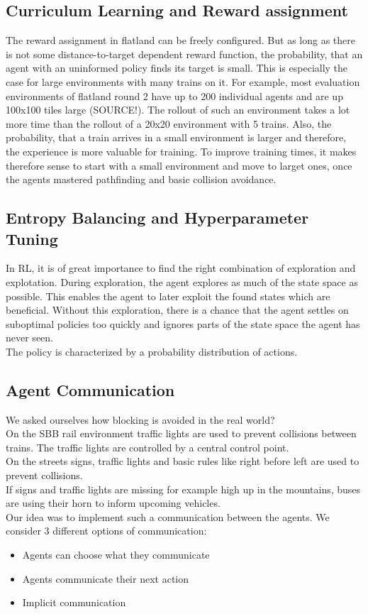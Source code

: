 \subsection*{Curriculum Learning and Reward assignment}\label{curriculum_learning}
The reward assignment in flatland can be freely configured. But as long as there is not some distance-to-target dependent reward function, the probability, that an agent with an uninformed policy finds its target is small. This is especially the case for large environments with many trains on it. For example, most evaluation environments of flatland round 2 have up to 200 individual agents and are up 100x100 tiles large (SOURCE!). The rollout of such an environment takes a lot more time than the rollout of a 20x20 environment with 5 trains. Also, the probability, that a train arrives in a small environment is larger and therefore, the experience is more valuable for training.
To improve training times, it makes therefore sense to start with a small environment and move to larget ones, once the agents mastered pathfinding and basic collision avoidance.

\subsection*{Entropy Balancing and Hyperparameter Tuning}\label{entropy_balancing_hyperparameter}
In RL, it is of great importance to find the right combination of exploration and explotation. During exploration, the agent explores as much of the state space as possible. This enables the agent to later exploit the found states which are beneficial. Without this exploration, there is a chance that the agent settles on suboptimal policies too quickly and ignores parts of the state space the agent has never seen.\\
The policy is characterized by a probability distribution of actions.

\subsection*{Agent Communication}\label{agent_communication}
We asked ourselves how blocking is avoided in the real world?\\
On the SBB rail environment traffic lights are used to prevent collisions between trains. The traffic lights are controlled by a central control point.\\
On the streets signs, traffic lights and basic rules like right before left are used to prevent collisions. \\
If signs and traffic lights are missing for example high up in the mountains, buses are using their horn to inform upcoming vehicles. \\
Our idea was to implement such a communication between the agents.
We consider 3 different options of communication:
\begin{itemize}
	\item Agents can choose what they communicate
	\item Agents communicate their next action
	\item Implicit communication
\end{itemize}

